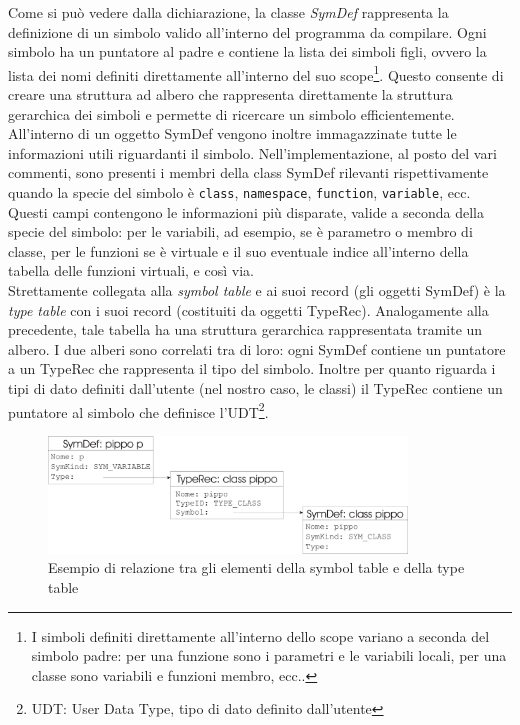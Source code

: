 \documentclass[a4paper, 11pt]{article}
\newcommand{\code}[1]{\scriptsize{\texttt{#1}}\normalsize}
\begin{document}
Come si pu\`o vedere dalla dichiarazione, la classe \emph{SymDef} rappresenta la definizione di un simbolo valido all'interno del programma da compilare. Ogni simbolo ha un puntatore al padre e contiene la lista dei simboli figli, ovvero la lista dei nomi definiti direttamente all'interno del suo scope\footnote{I simboli definiti direttamente all'interno dello scope variano a seconda del simbolo padre: per una funzione sono i parametri e le variabili locali, per una classe sono variabili e funzioni membro, ecc..}.
Questo consente di creare una struttura ad albero che rappresenta direttamente la struttura gerarchica dei simboli e permette di ricercare un simbolo efficientemente.
All'interno di un oggetto SymDef vengono inoltre immagazzinate tutte le informazioni utili riguardanti il simbolo. Nell'implementazione, al posto del vari commenti, sono presenti i membri della class SymDef rilevanti rispettivamente quando la specie del simbolo \`e \code{class}, \code{namespace}, \code{function}, \code{variable}, ecc.
Questi campi contengono le informazioni pi\`u disparate, valide a seconda della specie del simbolo: per le variabili, ad esempio, se \`e parametro o membro di classe, per le funzioni se \`e virtuale e il suo eventuale indice all'interno della tabella delle funzioni virtuali, e cos\`{i} via.
\\
Strettamente collegata alla \emph{symbol table} e ai suoi record (gli oggetti SymDef) \`e la \emph{type table} con i suoi record (costituiti da oggetti TypeRec). Analogamente alla precedente, tale tabella ha una struttura gerarchica rappresentata tramite un albero. I due alberi sono correlati tra di loro: ogni SymDef contiene un puntatore a un TypeRec che rappresenta il tipo del simbolo. Inoltre per quanto riguarda i tipi di dato definiti dall'utente (nel nostro caso, le classi) il TypeRec contiene un puntatore al simbolo che definisce l'UDT\footnote{UDT: User Data Type, tipo di dato definito dall'utente}.
\begin{figure}[ht]
\centering
\includegraphics[width=0.85\textwidth]{esempio1.eps}
\caption{Esempio di relazione tra gli elementi della symbol table e della type table}
\label{fig:esempio1}
\end{figure}
\end{document}
